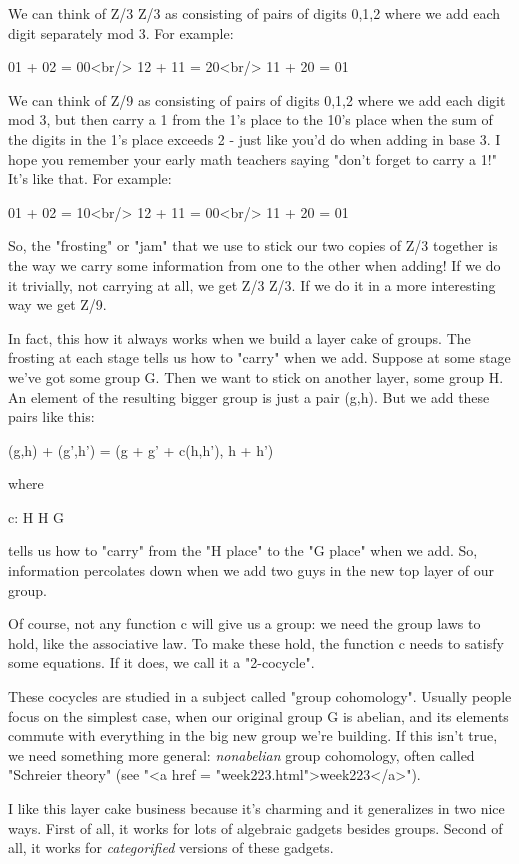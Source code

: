 We can think of Z/3 \oplus  Z/3 as consisting of pairs of digits 0,1,2
where we add each digit separately mod 3.  For example:

01 + 02 = 00<br/>
12 + 11 = 20<br/>
11 + 20 = 01

We can think of Z/9 as consisting of pairs of digits 0,1,2 where we
add each digit mod 3, but then carry a 1 from the 1's place to the
10's place when the sum of the digits in the 1's place exceeds 2 -
just like you'd do when adding in base 3.  I hope you remember your
early math teachers saying "don't forget to carry a 1!" It's
like that.  For example:

01 + 02 = 10<br/>
12 + 11 = 00<br/>
11 + 20 = 01

So, the "frosting" or "jam" that we use to stick
our two copies of Z/3 together is the way we carry some
information from one to the other when adding!  If we do it trivially,
not carrying at all, we get Z/3 \oplus  Z/3.  If we do it in a more
interesting way we get Z/9.

In fact, this how it always works when we build a layer cake
of groups.  The frosting at each stage tells us how to "carry"
when we add.  Suppose at some stage we've got some group G.  Then 
we want to stick on another layer, some group H.   An element of 
the resulting bigger group is just a pair (g,h).  But we add these
pairs like this:

(g,h) + (g',h') = (g + g' + c(h,h'), h + h')

where 

c: H \times  H \to  G

tells us how to "carry" from the "H place" to the
"G place" when we add.  So, information percolates down when
we add two guys in the new top layer of our group.

Of course, not any function c will give us a group: we
need the group laws to hold, like the associative law.  To 
make these hold, the function c needs to satisfy some equations.
If it does, we call it a "2-cocycle".  

These cocycles are studied in a subject called "group cohomology".
Usually people focus on the simplest case, when our original group 
G is abelian, and its elements commute with everything in the big 
new group we're building.  If this isn't true, we need something 
more general: \emph{nonabelian} group cohomology, often
called "Schreier theory" (see "<a href = "week223.html">week223</a>").

I like this layer cake business because it's charming and it
generalizes in two nice ways.  First of all, it works for
lots of algebraic gadgets besides groups.  Second of all, it
works for \emph{categorified} versions of these gadgets.  

